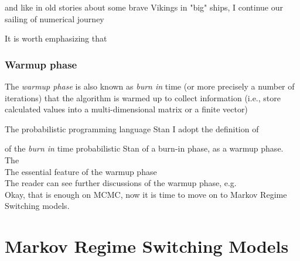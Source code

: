\documentclass[a4paper,11pt,english]{article}
\begin{document}
		and like in old stories about some brave Vikings in "big" ships, I continue our sailing of numerical journey

		It is worth emphasizing that 

			\subsubsection{Warmup phase}
			
			The \textit{warmup phase} is also known as \textit{burn in} time (or more precisely a number of iterations) that the algorithm 
			is warmed up to collect information (i.e., store calculated values into a multi-dimensional matrix or a finite vector)
			
			The probabilistic programming language Stan 
			I adopt the definition of 
			
			
			of the \textit{burn in} time probabilistic Stan  of a burn-in phase, as a warmup phase. The  \\
			
			The essential feature of the warmup phase\\

			
			The reader can see further discussions of the warmup phase, e.g. \\ %
			

			\noindent Okay, that is enough on MCMC, now it is time to move on to Markov Regime Switching models.











	\section{Markov Regime Switching Models} \label{sec:hmm}
\end{document}
